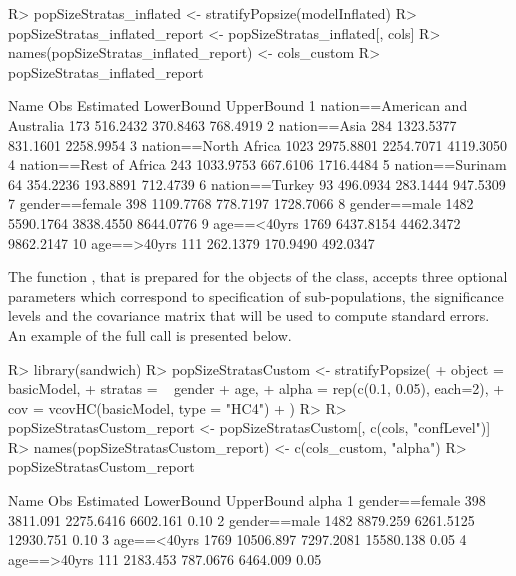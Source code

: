 \documentclass[
]{jss}
\newcommand{\1}{\mathcal{I}} \newcommand{\bZero}{\boldsymbol{0}}
\begin{document}
\begin{CodeChunk}
\begin{CodeInput}
R> popSizeStratas_inflated <- stratifyPopsize(modelInflated)
R> popSizeStratas_inflated_report <- popSizeStratas_inflated[, cols]
R> names(popSizeStratas_inflated_report) <- cols_custom
R> popSizeStratas_inflated_report
\end{CodeInput}
\begin{CodeOutput}
                             Name  Obs Estimated LowerBound UpperBound
1  nation==American and Australia  173  516.2432   370.8463   768.4919
2                    nation==Asia  284 1323.5377   831.1601  2258.9954
3            nation==North Africa 1023 2975.8801  2254.7071  4119.3050
4          nation==Rest of Africa  243 1033.9753   667.6106  1716.4484
5                 nation==Surinam   64  354.2236   193.8891   712.4739
6                  nation==Turkey   93  496.0934   283.1444   947.5309
7                  gender==female  398 1109.7768   778.7197  1728.7066
8                    gender==male 1482 5590.1764  3838.4550  8644.0776
9                     age==<40yrs 1769 6437.8154  4462.3472  9862.2147
10                    age==>40yrs  111  262.1379   170.9490   492.0347
\end{CodeOutput}
\end{CodeChunk}

The function , that is prepared for the objects of
the  class, accepts three optional
parameters  which correspond to specification
of sub-populations, the significance levels and the covariance matrix
that will be used to compute standard errors. An example of the full
call is presented below.

\begin{CodeChunk}
\begin{CodeInput}
R> library(sandwich)
R> popSizeStratasCustom <- stratifyPopsize(
+   object  = basicModel,
+   stratas = ~ gender + age, 
+   alpha   = rep(c(0.1, 0.05), each=2), 
+   cov     = vcovHC(basicModel, type = "HC4")
+ )
R> 
R> popSizeStratasCustom_report <- popSizeStratasCustom[, c(cols, "confLevel")]
R> names(popSizeStratasCustom_report) <- c(cols_custom, "alpha")
R> popSizeStratasCustom_report
\end{CodeInput}
\begin{CodeOutput}
            Name  Obs Estimated LowerBound UpperBound alpha
1 gender==female  398  3811.091  2275.6416   6602.161  0.10
2   gender==male 1482  8879.259  6261.5125  12930.751  0.10
3    age==<40yrs 1769 10506.897  7297.2081  15580.138  0.05
4    age==>40yrs  111  2183.453   787.0676   6464.009  0.05
\end{CodeOutput}
\end{CodeChunk}
\end{document}
